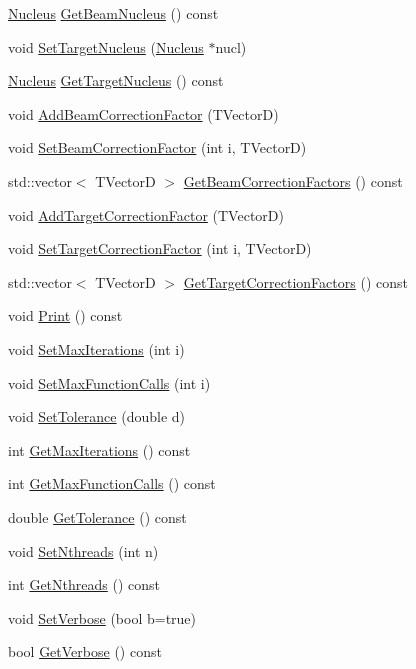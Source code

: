 \begin{DoxyCompactItemize}
\item 
\hyperlink{classNucleus}{Nucleus} \hyperlink{classCoulExSimFitter_a40bc47bee8f51f9dab8763e87c34fb63}{Get\-Beam\-Nucleus} () const 
\item 
void \hyperlink{classCoulExSimFitter_ae7d4c64f558a035a2f3d6993db2969ed}{Set\-Target\-Nucleus} (\hyperlink{classNucleus}{Nucleus} $\ast$nucl)
\item 
\hyperlink{classNucleus}{Nucleus} \hyperlink{classCoulExSimFitter_a6eacf96639a5bd3908636ab253d8c9b3}{Get\-Target\-Nucleus} () const 
\item 
void \hyperlink{classCoulExSimFitter_afe7d584cbdec110df18b34e5bd0bf2dc}{Add\-Beam\-Correction\-Factor} (T\-Vector\-D)
\item 
void \hyperlink{classCoulExSimFitter_a38af2f165ee0e21c2f037b8d8eddee78}{Set\-Beam\-Correction\-Factor} (int i, T\-Vector\-D)
\item 
std\-::vector$<$ T\-Vector\-D $>$ \hyperlink{classCoulExSimFitter_afebf6d2ace4db82026f6ccc865fa821c}{Get\-Beam\-Correction\-Factors} () const 
\item 
void \hyperlink{classCoulExSimFitter_a9c4f96557f62a6f0dbd9386841cd8860}{Add\-Target\-Correction\-Factor} (T\-Vector\-D)
\item 
void \hyperlink{classCoulExSimFitter_af4764a0abfbec937d6aaf51459d741a8}{Set\-Target\-Correction\-Factor} (int i, T\-Vector\-D)
\item 
std\-::vector$<$ T\-Vector\-D $>$ \hyperlink{classCoulExSimFitter_ae528d5210550e3a751a053204d24d7a8}{Get\-Target\-Correction\-Factors} () const 
\item 
void \hyperlink{classCoulExSimFitter_ad2b70cca6d786a23f35231cf931ef65f}{Print} () const 
\item 
void \hyperlink{classCoulExSimFitter_ae8bcedc89a1730f6295cdf862643aa35}{Set\-Max\-Iterations} (int i)
\item 
void \hyperlink{classCoulExSimFitter_a5d482897c57846bf1b83c645843c016f}{Set\-Max\-Function\-Calls} (int i)
\item 
void \hyperlink{classCoulExSimFitter_af2da6ea0d1104d2516d453ee18a234f2}{Set\-Tolerance} (double d)
\item 
int \hyperlink{classCoulExSimFitter_acdbafed7b7924be5e1e4db1f423ec3b9}{Get\-Max\-Iterations} () const 
\item 
int \hyperlink{classCoulExSimFitter_a2b02493b398ecb403eba6d2e7749afbd}{Get\-Max\-Function\-Calls} () const 
\item 
double \hyperlink{classCoulExSimFitter_a798bbe43d1e820d600b3fa2530e7be0b}{Get\-Tolerance} () const 
\item 
void \hyperlink{classCoulExSimFitter_a900dcc1fe094d4d4890d52c48f6240ca}{Set\-Nthreads} (int n)
\item 
int \hyperlink{classCoulExSimFitter_a2b33f0db4913d47610c616e0609709a4}{Get\-Nthreads} () const 
\item 
void \hyperlink{classCoulExSimFitter_a3ed1f75a477a2386c801c9b003c11aed}{Set\-Verbose} (bool b=true)
\item 
bool \hyperlink{classCoulExSimFitter_abbcbf6dd58cc2bb7e069ca28335e0519}{Get\-Verbose} () const 
\end{DoxyCompactItemize}


